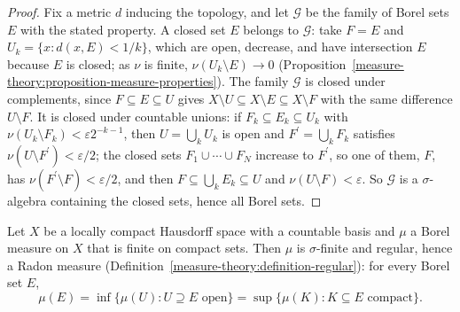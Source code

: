 \begin{proof}
Fix a metric $d$ inducing the topology, and let $\mathcal{G}$ be the family of Borel sets $E$ with the stated property. A closed set $E$ belongs to $\mathcal{G}$: take $F = E$ and
$U_k = \{x : d(x, E) < 1/k\}$, which are open, decrease, and have intersection $E$ because $E$ is closed; as $\nu$ is finite, $\nu(U_k \setminus E) \to 0$
(Proposition~\ref{measure-theory:proposition-measure-properties}). The family $\mathcal{G}$ is closed under complements, since $F \subseteq E \subseteq U$ gives
$X \setminus U \subseteq X \setminus E \subseteq X \setminus F$ with the same difference $U \setminus F$. It is closed under countable unions: if $F_k \subseteq E_k \subseteq U_k$ with
$\nu(U_k \setminus F_k) < \varepsilon 2^{-k-1}$, then $U = \bigcup_kU_k$ is open and $F^{\prime} = \bigcup_kF_k$ satisfies $\nu(U \setminus F^{\prime}) < \varepsilon/2$; the closed sets
$F_1 \cup \cdots \cup F_N$ increase to $F^{\prime}$, so one of them, $F$, has $\nu(F^{\prime} \setminus F) < \varepsilon/2$, and then $F \subseteq \bigcup_kE_k \subseteq U$ and $\nu(U \setminus F) < \varepsilon$.
So $\mathcal{G}$ is a $\sigma$-algebra containing the closed sets, hence all Borel sets.
\end{proof}

\begin{proposition}\label{radon-measures:proposition-radon-automatic}
Let $X$ be a locally compact Hausdorff space with a countable basis and $\mu$ a Borel measure on $X$ that is finite on compact sets. Then $\mu$ is $\sigma$-finite and regular, hence a Radon measure
(Definition~\ref{measure-theory:definition-regular}): for every Borel set $E$,
\[
\mu(E) = \inf\{\mu(U) : U \supseteq E \text{ open}\} = \sup\{\mu(K) : K \subseteq E \text{ compact}\}.
\]
\end{proposition}

